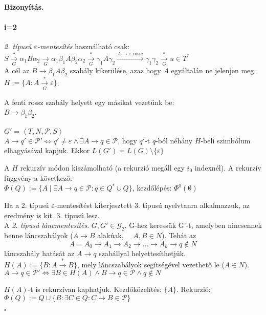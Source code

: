 \documentclass[fleqn,10pt,a4paper]{article}
\newcommand{\ob}{\hfill$\square$}
\newcommand{\exist}{\exists}
\renewcommand{\epsilon}{\varepsilon}
\theoremstyle{magyar}
\newenvironment{biz}{\begin{trivlist}\item\relax\mbox{\textbf{Bizonyítás.\enskip}}\ignorespaces}{\ob\end{trivlist}}
\newcommand{\Nytan}{\mathcal{G}}
\newcommand{\szabalyok}{\mathcal{P}}
\begin{document}
\begin{biz}
    \paragraph{i=2} \emph{2. típusú $\epsilon$-mentesítés} használható csak:\\
    $S\xrightarrow[G]{*}\alpha_1 B\alpha_2\xrightarrow[G]{}\alpha_1\beta_1 A  \beta_2\alpha_2
    \xrightarrow[G]{*} \gamma_1 A \gamma_2 \xrightarrow{A\to \epsilon \text{ rossz}} \gamma_1\gamma_2
    \xrightarrow[G]{*} u\in T^*$\\
    A cél az $B \to \beta_1 A  \beta_2$ szabály kikerülése, azaz hogy $A$ egyáltalán ne jelenjen meg.\\
    $H := \{ A : A \xrightarrow[G]{*} \epsilon \}$.
    
    A fenti rossz szabály helyett egy másikat vezetünk be:\\
    $B \to \beta_1 \beta_2$. \\\\

    \noindent $G' = \left< T, N, \szabalyok, S\right>$\\
    $A\to q' \in \szabalyok' \iff q' \neq \epsilon \land \exists A\to q\in \szabalyok$, hogy $q'$-t $q$-ból néhány
    $H$-beli szimbólum elhagyásával kapjuk. Ekkor $L(G') = L(G)\setminus \{\epsilon\}$
    
    A $H$ rekurzív módon kiszámolható (a rekurzió megáll egy $i_0$ indexnél). A rekurzív függvény a következő:\\
    $\Phi(Q) := \{ A \mid \exist A\to q \in \szabalyok : q \in Q^* \cup Q\}$, kezdőlépés: $\Phi^0(\emptyset)$

    Ha a 2. típusú $\epsilon$-mentesítést kiterjesztett 3. típusú nyelvtanra alkalmazzuk, az eredmény is kit. 3. típusú
    lesz.\\

    A \emph{2. típusú láncmentesítés}. $G,G'\in\Nytan_2$. G-hez keressük G'-t, amelyben nincsennek benne láncszabályok
    ($A\to B$ alakúak, $\quad A,B\in N$). Tehát  az\
    \[A=A_0\to A_1\to A_2\to \ldots \to A_k\to q \not\in N\] láncszabály
    hatását az $A\to q$ szabállyal helyettesíthetjük.\\
    $H(A) := \{ B : A\xrightarrow{*} B\}$, mely láncszabályok segítségével vezethető le ($A \in N$).\\
    
    $A\to q\in \szabalyok' \iff \exists B\in H(A)\land B\to q \in \szabalyok \land q\not\in N$
    
    $H(A)$-t is rekurzívan kaphatjuk. Kezdőközelítés: $\{ A \}$. Rekurzió:\\
    $\Phi(Q) := Q \cup \{ B : \exists C \in Q : C \to B \in \szabalyok \}$
    

\end{biz}
\end{document}
